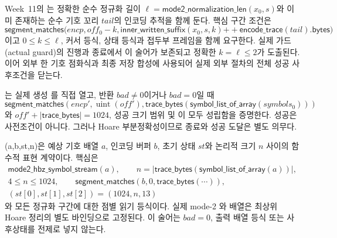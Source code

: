 \begin{definition}
\label{def:rans-tail-aware-inner}
Week~11의 는 정확한 순수 정규화 길이
\(\ell=\mathsf{mode2\_normalization\_len}(x_0,s)\)와 이미 존재하는 순수
기호 꼬리 \(tail\)의 인코딩 추적을 함께 둔다. 핵심 구간 조건은
\[
  \mathsf{segment\_matches}\bigl(
    encp,off_0-k,
    \mathsf{inner\_written\_suffix}(x_0,s,k)\mathbin{++}
      \mathsf{encode\_trace}(tail).\mathsf{bytes}
  \bigr)
\]
이고 \(0\le k\le\ell\), 커서 등식, 상태 등식과 접두부 프레임을 함께
요구한다. 실제 가드(actual guard)의 진행과 종료에서 이 술어가 보존되고 정확한
\(k=\ell\le2\)가 도출된다. 이어 외부 한 기호 점화식과 최종 저장 합성에 사용되어
실제 외부 절차의 전체 성공 사후조건을 닫는다.
\end{definition}

\begin{verified}
\label{thm:rans-encoder-suffix}
는 실제 생성
를 직접 열고, 반환 \(bad\ne0\)이거나 \(bad=0\)일 때
\[
  \mathsf{segment\_matches}
  (encp',\operatorname{uint}(off'),
   \mathsf{trace\_bytes}(\mathsf{symbol\_list\_of\_array}(symbols_0)))
\]
와 \(off'+|\mathsf{trace\_bytes}|=1024\), 성공 크기 범위 및
이 모두 성립함을 증명한다. 성공은 사전조건이 아니다.
그러나 Hoare 부분정확성이므로 종료와 성공 도달은 별도 의무다.
\end{verified}

\begin{definition}
\label{def:rans-decoder-exact-input}
(a,b,st,n)은 예상 기호 배열 \(a\),
인코딩 버퍼 \(b\), 초기 상태 \(st\)와 논리적 크기 \(n\) 사이의 함수적 표현
계약이다. 핵심은
\[
\begin{gathered}
  \mathsf{mode2\_hbz\_symbol\_stream}(a),\qquad
  n=|\mathsf{trace\_bytes}(\mathsf{symbol\_list\_of\_array}(a))|,\\
  4\le n\le1024,\qquad
  \mathsf{segment\_matches}(b,0,\mathsf{trace\_bytes}(\cdots)),\\
  (st[0],st[1],st[2])=(1024,n,13)
\end{gathered}
\]
와 모든 정규화 구간에 대한 점별 읽기 등식이다. 실제 mode-2
와  배열은 최상위 Hoare
정리의 별도 바인딩으로 고정된다. 이 술어는 \(bad=0\), 출력 배열 등식 또는
사후상태를 전제로 넣지 않는다.
\end{definition}

